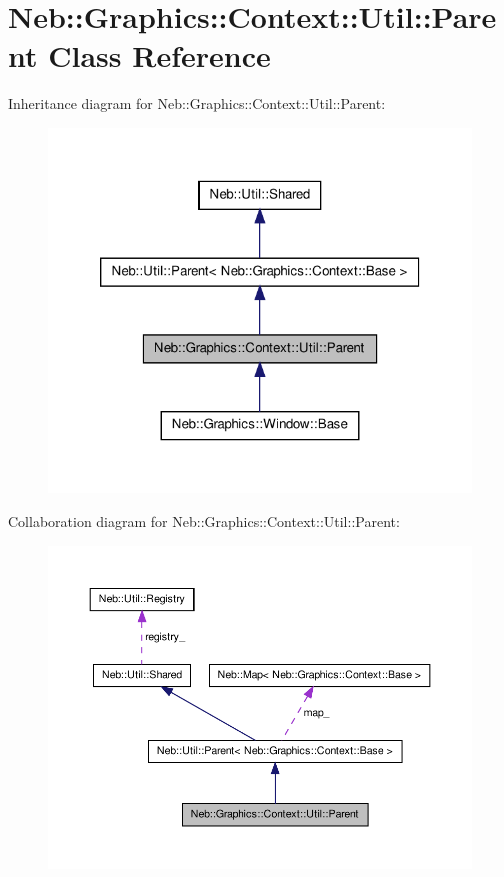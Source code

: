 \hypertarget{classNeb_1_1Graphics_1_1Context_1_1Util_1_1Parent}{\section{\-Neb\-:\-:\-Graphics\-:\-:\-Context\-:\-:\-Util\-:\-:\-Parent \-Class \-Reference}
\label{classNeb_1_1Graphics_1_1Context_1_1Util_1_1Parent}
}


\-Inheritance diagram for \-Neb\-:\-:\-Graphics\-:\-:\-Context\-:\-:\-Util\-:\-:\-Parent\-:\nopagebreak
\begin{figure}[H]
\begin{center}
\leavevmode
\includegraphics[width=320pt]{classNeb_1_1Graphics_1_1Context_1_1Util_1_1Parent__inherit__graph}
\end{center}
\end{figure}


\-Collaboration diagram for \-Neb\-:\-:\-Graphics\-:\-:\-Context\-:\-:\-Util\-:\-:\-Parent\-:\nopagebreak
\begin{figure}[H]
\begin{center}
\leavevmode
\includegraphics[width=350pt]{classNeb_1_1Graphics_1_1Context_1_1Util_1_1Parent__coll__graph}
\end{center}
\end{figure}
